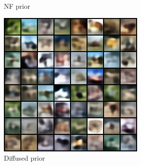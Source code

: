 \documentclass{article}
\begin{document}
\begin{figure}
\begin{subfigure}{.33\textwidth}
    \caption{NF prior}\label{fig:CIFAR10_NF}
    \end{subfigure}
    \begin{subfigure}{.33\textwidth}
    \includegraphics[width=.99\textwidth]{figures/DDPM_CIFAR10.png}
    \caption{Diffused prior}\label{fig:CIFAR10_DDPM}
    \end{subfigure}
    \caption{Samples generated by a VAE trained on CIFAR10 for three different prior models. \textit{The diffusion prior leads to slightly better sampling quality than the Gaussian distribution and similar to the NF prior.}} \label{fig:CIFAR10}
    \vspace{1em}
    \centering
    \begin{subfigure}{.33\textwidth}

\end{subfigure}
\end{figure}
\end{document}
